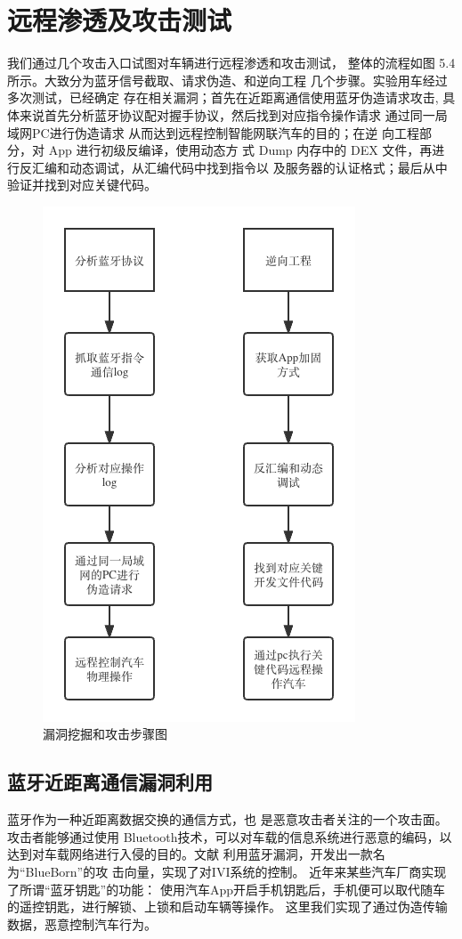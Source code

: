 \section{远程渗透及攻击测试}
我们通过几个攻击入口试图对车辆进行远程渗透和攻击测试，
整体的流程如图 5.4所示。大致分为蓝牙信号截取、请求伪造、和逆向工程
几个步骤。实验用车经过多次测试，已经确定
存在相关漏洞；首先在近距离通信使用蓝牙伪造请求攻击, 具体来说首先分析蓝牙协议配对握手协议，然后找到对应指令操作请求
通过同一局域网PC进行伪造请求 从而达到远程控制智能网联汽车的目的；在逆
向工程部分，对 App 进行初级反编译，使用动态方
式 Dump 内存中的 DEX 文件，再进行反汇编和动态调试，从汇编代码中找到指令以
及服务器的认证格式；最后从中验证并找到对应关键代码。
\begin{figure}
  \centering
  \includegraphics[scale=0.5]{resources/img/i23.png}
  \caption{漏洞挖掘和攻击步骤图}
\end{figure}
\newline
\subsection {蓝牙近距离通信漏洞利用}
蓝牙作为一种近距离数据交换的通信方式，也
是恶意攻击者关注的一个攻击面。攻击者能够通过使用 Bluetooth技术，可以对车载的信息系统进行恶意的编码，以达到对车载网络进行入侵的目的。文献\cite{antian}
利用蓝牙漏洞，开发出一款名为“BlueBorn”的攻
击向量，实现了对IVI系统的控制。
近年来某些汽车厂商实现了所谓“蓝牙钥匙”的功能：
使用汽车App开启手机钥匙后，手机便可以取代随车的遥控钥匙，进行解锁、上锁和启动车辆等操作。
这里我们实现了通过伪造传输数据，恶意控制汽车行为。
